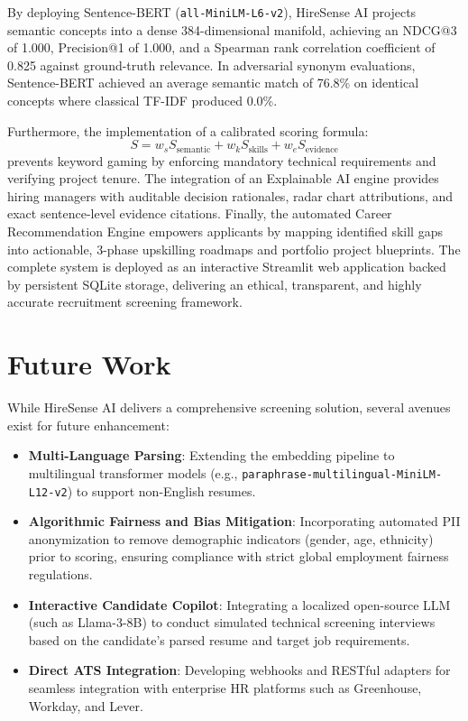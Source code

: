 \documentclass[12pt,a4paper]{report}
\begin{document}
By deploying Sentence-BERT (\texttt{all-MiniLM-L6-v2}), HireSense AI projects semantic concepts into a dense 384-dimensional manifold, achieving an NDCG@3 of 1.000, Precision@1 of 1.000, and a Spearman rank correlation coefficient of 0.825 against ground-truth relevance. In adversarial synonym evaluations, Sentence-BERT achieved an average semantic match of 76.8\% on identical concepts where classical TF-IDF produced 0.0\%.

Furthermore, the implementation of a calibrated scoring formula:
\begin{equation}
S = w_s S_{\text{semantic}} + w_k S_{\text{skills}} + w_e S_{\text{evidence}} \nonumber
\end{equation}
prevents keyword gaming by enforcing mandatory technical requirements and verifying project tenure. The integration of an Explainable AI engine provides hiring managers with auditable decision rationales, radar chart attributions, and exact sentence-level evidence citations. Finally, the automated Career Recommendation Engine empowers applicants by mapping identified skill gaps into actionable, 3-phase upskilling roadmaps and portfolio project blueprints. The complete system is deployed as an interactive Streamlit web application backed by persistent SQLite storage, delivering an ethical, transparent, and highly accurate recruitment screening framework.

\section{Future Work}
While HireSense AI delivers a comprehensive screening solution, several avenues exist for future enhancement:
\begin{itemize}
    \item \textbf{Multi-Language Parsing}: Extending the embedding pipeline to multilingual transformer models (e.g., \texttt{paraphrase-multilingual-MiniLM-L12-v2}) to support non-English resumes.
    \item \textbf{Algorithmic Fairness and Bias Mitigation}: Incorporating automated PII anonymization to remove demographic indicators (gender, age, ethnicity) prior to scoring, ensuring compliance with strict global employment fairness regulations.
    \item \textbf{Interactive Candidate Copilot}: Integrating a localized open-source LLM (such as Llama-3-8B) to conduct simulated technical screening interviews based on the candidate's parsed resume and target job requirements.
    \item \textbf{Direct ATS Integration}: Developing webhooks and RESTful adapters for seamless integration with enterprise HR platforms such as Greenhouse, Workday, and Lever.
\end{itemize}
\end{document}
